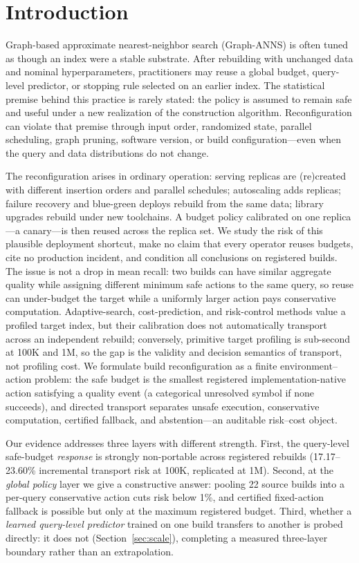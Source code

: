 \documentclass{article}
\begin{document}
\section{Introduction}
\label{sec:intro}

Graph-based approximate nearest-neighbor search (Graph-ANNS) is often tuned as though an index were a
stable substrate. After rebuilding with unchanged data and nominal hyperparameters, practitioners may reuse
a global budget, query-level predictor, or stopping rule selected on an earlier index. The statistical
premise behind this practice is rarely stated: the policy is assumed to remain safe and useful under a new
realization of the construction algorithm. Reconfiguration can violate that premise through input order,
randomized state, parallel scheduling, graph pruning, software version, or build configuration---even when
the query and data distributions do not change.

The reconfiguration arises in ordinary operation: serving replicas are (re)created with different insertion
orders and parallel schedules; autoscaling adds replicas; failure recovery and blue-green deploys rebuild
from the same data; library upgrades rebuild under new toolchains. A budget policy calibrated on one
replica---a canary---is then reused across the replica set. We study the risk of this plausible deployment
shortcut, make no claim that every operator reuses budgets, cite no production incident, and condition all
conclusions on registered builds. The issue is not a drop in mean recall: two builds can have similar
aggregate quality while assigning different minimum safe actions to the same query, so reuse can
under-budget the target while a uniformly larger action pays conservative computation. Adaptive-search,
cost-prediction, and risk-control methods value a profiled target index, but their calibration does not
automatically transport across an independent rebuild; conversely, primitive target profiling is sub-second
at 100K and 1M, so the gap is the validity and decision semantics of transport, not profiling cost. We
formulate build reconfiguration as a finite environment--action problem: the safe budget is the smallest
registered implementation-native action satisfying a quality event (a categorical unresolved symbol if none
succeeds), and directed transport separates unsafe execution, conservative computation, certified fallback,
and abstention---an auditable risk--cost object.

Our evidence addresses three layers with different strength. First, the query-level safe-budget
\emph{response} is strongly non-portable across registered rebuilds (17.17--23.60\% incremental transport
risk at 100K, replicated at 1M). Second, at the \emph{global policy} layer we give a constructive answer:
pooling 22 source builds into a per-query conservative action cuts risk below 1\%, and certified fixed-action
fallback is possible but only at the maximum registered budget. Third, whether a \emph{learned query-level
predictor} trained on one build transfers to another is probed directly: it does not
(Section~\ref{sec:scale}), completing a measured three-layer boundary rather than an extrapolation.
\end{document}
